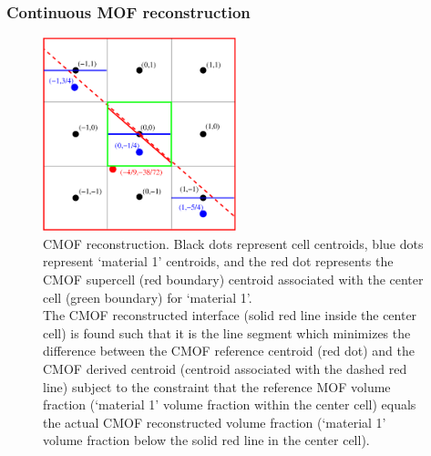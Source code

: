 \documentclass[preprint,12pt]{Definitions/elsarticle}
\begin{document}
\FloatBarrier
\subsubsection{Continuous MOF reconstruction}
\begin{figure}[H]
	\centering
	\includegraphics[width=0.5\textwidth]{CMOFcentroid.eps}
	\caption{CMOF reconstruction.
		Black dots represent cell centroids, blue dots represent 
		`material 1' centroids, and the red dot represents the CMOF supercell (red boundary)
		centroid associated with the center cell (green boundary) for `material 1'. \\
		The CMOF
		reconstructed interface (solid red line inside the center cell) is found such that it is the line
		segment which minimizes the difference between the CMOF reference 
		centroid (red dot) and the CMOF derived centroid (centroid associated
		with the dashed red line) subject to the constraint that
		the reference MOF volume fraction (`material 1' volume fraction within the 
		center cell) equals the actual CMOF reconstructed
		volume fraction (`material 1' volume fraction below the solid red line in the center cell).
		\label{CMOFstencil} }
\end{figure}   

\FloatBarrier
\end{document}
